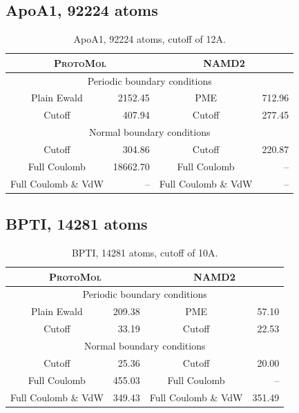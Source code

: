 \documentclass[11pt]{article}
\begin{document}
\subsection{ApoA1, 92224 atoms}
\begin{table}[htb]
  \begin{center}
    \begin{tabular}{|c|r||c|r|}\hline
      \multicolumn{2}{|c||}{\textsc{ProtoMol}}&\multicolumn{2}{c|}{ \textsc{NAMD2}}\\\hline\hline
      \multicolumn{4}{|c|}{Periodic boundary conditions}\\\hline
      Plain Ewald         & 2152.45& PME                 &  712.96\\\hline
      Cutoff              &  407.94& Cutoff              & 277.45\\\hline\hline
      \multicolumn{4}{|c|}{Normal boundary conditions}\\\hline
      Cutoff              &  304.86& Cutoff              & 220.87\\\hline
      Full Coulomb        &18662.70& Full Coulomb        &--  \\\hline
      Full Coulomb \& VdW & -- & Full Coulomb \& VdW & -- \\\hline
    \end{tabular}
  \end{center}
  \caption{ApoA1, 92224 atoms, cutoff of 12A.\label{ApoA192224}}
\end{table}

\subsection{BPTI, 14281 atoms}
\begin{table}[htb]
  \begin{center}
    \begin{tabular}{|c|r||c|r|}\hline
      \multicolumn{2}{|c||}{\textsc{ProtoMol}}&\multicolumn{2}{c|}{ \textsc{NAMD2}}\\\hline\hline
      \multicolumn{4}{|c|}{Periodic boundary conditions}\\\hline
      Plain Ewald         & 209.38& PME                 &  57.10\\\hline
      Cutoff              &  33.19& Cutoff              &  22.53\\\hline\hline
      \multicolumn{4}{|c|}{Normal boundary conditions}\\\hline
      Cutoff              &  25.36& Cutoff              &  20.00\\\hline
      Full Coulomb        & 455.03& Full Coulomb        & --\\\hline
      Full Coulomb \& VdW & 349.43& Full Coulomb \& VdW & 351.49\\\hline
    \end{tabular}
  \end{center}
  \caption{BPTI, 14281 atoms, cutoff of 10A.\label{BPTI14281}}
\end{table}
\end{document}

